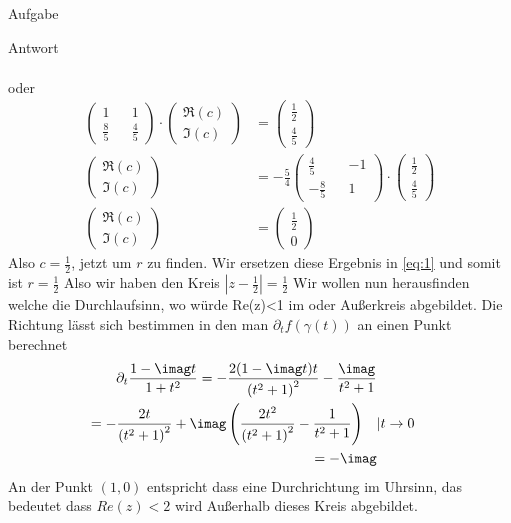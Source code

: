 \documentclass{scrartcl}
\let\*\cdot
\begin{document}
\begin{section}{Aufgabe}
\begin{subsection}{Antwort}
\begin{itemize}
\begin{align*}
\end{align*}
oder
\begin{align*}
    \begin{pmatrix}
    1&&1\\\frac{8}{5}&&\frac{4}{5}
\end{pmatrix}\*\begin{pmatrix}
    \Re(c)\\\Im(c)
\end{pmatrix}&=\begin{pmatrix}
    \frac{1}{2}\\\frac{4}{5}
\end{pmatrix}\\
  \begin{pmatrix}
    \Re(c)\\\Im(c)
\end{pmatrix}&=-\frac{5}{4}\begin{pmatrix}
    \frac{4}{5}&&-1\\
    -\frac{8}{5}&&1
\end{pmatrix}\*\begin{pmatrix}
    \frac{1}{2}\\\frac{4}{5}
\end{pmatrix}\\
\begin{pmatrix}
    \Re(c)\\\Im(c)
\end{pmatrix}&=\begin{pmatrix}
    \frac{1}{2}\\0
\end{pmatrix}
\end{align*}
Also $c=\frac{1}{2}$, jetzt um $r$ zu finden. Wir ersetzen diese Ergebnis in \eqref{eq:1} und somit ist $r=\frac{1}{2}$
Also wir haben den Kreis $\left|z-\frac{1}{2}\right|=\frac{1}{2}$
Wir wollen nun herausfinden welche die Durchlaufsinn, wo würde Re(z)<1 im oder Außerkreis abgebildet. Die Richtung lässt sich bestimmen in den man $\partial_t f(\gamma(t))$ an einen Punkt berechnet
\begin{align*}
        \partial_t \frac{1-\imag t}{1+t^2}
=-\frac{2 (1-\imag t) t}{\left(t^2+1\right)^2}-\frac{\imag}{t^2+1}\\
=-\frac{2 t}{\left(t^2+1\right)^2}+\imag \left(\frac{2
   t^2}{\left(t^2+1\right)^2}-\frac{1}{t^2+1}\right)\quad &|t\rightarrow 0\\
   =-\imag
\end{align*}
An der Punkt $(1,0)$ entspricht dass eine Durchrichtung im Uhrsinn, das bedeutet dass $Re(z)<2$ wird Außerhalb dieses Kreis abgebildet.\\
\begin{figure}[H]
\centering
\begin{subfigure}{.47\textwidth}
  \centering
  \begin{tikzpicture}[x=0.8cm,y=0.8cm]


\end{tikzpicture}
\end{subfigure}
\end{figure}
\end{itemize}
\end{subsection}
\end{section}
\end{document}
